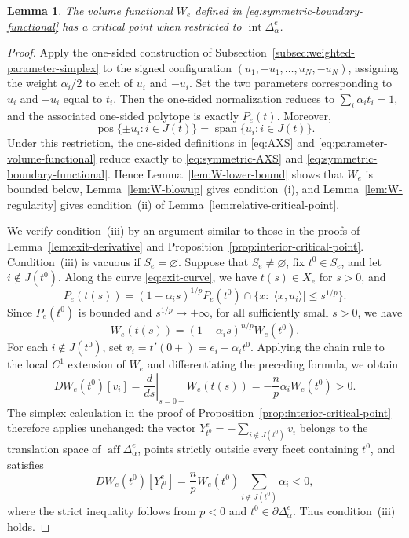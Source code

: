 \documentclass[12pt,reqno]{amsart}
\numberwithin{equation}{section}
\newtheorem{lemma}[theorem]{Lemma}
\theoremstyle{remark}
\DeclareMathOperator{\pos}{pos}
\DeclareMathOperator{\spanop}{span}
\begin{document}
\begin{lemma}\label{lem:symmetric-critical-point}
	The volume functional \(W_e\) defined in
	\eqref{eq:symmetric-boundary-functional} has a critical point when
	restricted to \(\operatorname{int}\Delta_\alpha^e\).
\end{lemma}




\begin{proof}
Apply the one-sided construction of
Subsection~\ref{subsec:weighted-parameter-simplex} to the signed
configuration
\((u_1,-u_1,\ldots,u_N,-u_N)\), assigning the weight
\(\alpha_i/2\) to each of \(u_i\) and \(-u_i\). Set the two
parameters corresponding to \(u_i\) and \(-u_i\) equal to \(t_i\).
Then the one-sided normalization reduces to
\(\sum_i\alpha_i t_i=1\), and the associated one-sided polytope is
exactly \(P_e(t)\). Moreover,
	\[
	\pos\{\pm u_i:i\in J(t)\}
	=
	\spanop\{u_i:i\in J(t)\}.
	\]
	Under this restriction, the one-sided definitions in
	\eqref{eq:AXS} and \eqref{eq:parameter-volume-functional} reduce
	exactly to \eqref{eq:symmetric-AXS} and
	\eqref{eq:symmetric-boundary-functional}. Hence
	Lemma~\ref{lem:W-lower-bound} shows that \(W_e\) is bounded below,
	Lemma~\ref{lem:W-blowup} gives condition~\textup{(i)}, and
	Lemma~\ref{lem:W-regularity} gives condition~\textup{(ii)} of
	Lemma~\ref{lem:relative-critical-point}.
	
	
	We verify condition~\textup{(iii)} by an argument similar to those
	in the proofs of Lemma~\ref{lem:exit-derivative} and
	Proposition~\ref{prop:interior-critical-point}.
	Condition~\textup{(iii)} is vacuous if \(S_e=\varnothing\). Suppose
	that \(S_e\neq\varnothing\), fix \(t^0\in S_e\), and let
	\(i\notin J(t^0)\). Along the curve \eqref{eq:exit-curve}, we have
	\(t(s)\in X_e\) for \(s>0\), and
	\[
	P_e(t(s))
	=
	(1-\alpha_i s)^{1/p}P_e(t^0)
	\cap
	\{x:|\langle x,u_i\rangle|\leq s^{1/p}\}.
	\]
	Since \(P_e(t^0)\) is bounded and \(s^{1/p}\to+\infty\),  for all sufficiently small \(s>0\), we have
	\[
	W_e(t(s))=(1-\alpha_i s)^{n/p}W_e(t^0).
	\]
For each \(i\notin J(t^0)\), set
\(v_i=t'(0+)=e_i-\alpha_i t^0\). Applying the chain rule to the
local \(C^1\) extension of \(W_e\) and differentiating the preceding
formula, we obtain
\[
DW_e(t^0)[v_i]
=
\left.\frac{d}{ds}\right|_{s=0+}W_e(t(s))
=
-\frac np\alpha_iW_e(t^0)
>
0.
\] The simplex calculation in the proof of
	Proposition~\ref{prop:interior-critical-point} therefore applies
	unchanged: the vector
	\(Y_{t^0}^e=-\sum_{i\notin J(t^0)}v_i\) belongs to the translation
	space of \(\operatorname{aff}\Delta_\alpha^e\), points strictly
	outside every facet containing \(t^0\), and satisfies
	\[
	DW_e(t^0)[Y_{t^0}^e]
	=
	\frac np W_e(t^0)
	\sum_{i\notin J(t^0)}\alpha_i
	<0,
	\]
	where the strict inequality follows from \(p<0\) and
	\(t^0\in\partial\Delta_\alpha^e\). Thus condition~\textup{(iii)} holds.
	

\end{proof}
\end{document}
